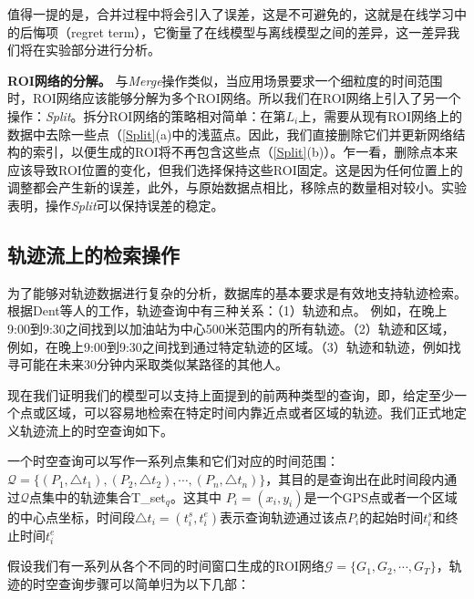值得一提的是，合并过程中将会引入了误差，这是不可避免的，这就是在线学习中的后悔项（regret term），它衡量了在线模型与离线模型之间的差异，这一差异我们将在实验部分进行分析。



\vspace{3mm}
\noindent\textbf{ROI网络的分解。} 
与\emph{Merge}操作类似，当应用场景要求一个细粒度的时间范围时，ROI网络应该能够分解为多个ROI网络。所以我们在ROI网络上引入了另一个操作：\emph{Split}。拆分ROI网络的策略相对简单：在第$L_i$上，需要从现有ROI网络上的数据中去除一些点（\ref{Split}(a)中的浅蓝点。因此，我们直接删除它们并更新网络结构的索引，以便生成的ROI将不再包含这些点（\ref{Split}(b)）。乍一看，删除点本来应该导致ROI位置的变化，但我们选择保持这些ROI固定。这是因为任何位置上的调整都会产生新的误差，此外，与原始数据点相比，移除点的数量相对较小。实验表明，操作\emph{Split}可以保持误差的稳定。

\subsection{轨迹流上的检索操作}
为了能够对轨迹数据进行复杂的分析，数据库的基本要求是有效地支持轨迹检索。根据Dent等人\cite {deng2011trajectory}的工作，轨迹查询中有三种关系：（1）轨迹和点。 例如，在晚上9:00到9:30之间找到以加油站为中心500米范围内的所有轨迹。（2）轨迹和区域，例如，在晚上9:00到9:30之间找到通过特定轨迹的区域。（3）轨迹和轨迹，例如找寻可能在未来30分钟内采取类似某路径的其他人。

现在我们证明我们的模型可以支持上面提到的前两种类型的查询，即，给定至少一个点或区域，可以容易地检索在特定时间内靠近点或者区域的轨迹。我们正式地定义轨迹流上的时空查询如下。


\begin{dingyi}[轨迹的时空查询]
一个时空查询可以写作一系列点集和它们对应的时间范围：$\mathcal{Q} = \{(P_1, \triangle t_1), (P_2, \triangle t_2), \cdots, (P_n, \triangle t_n)\}$，其目的是查询出在此时间段内通过$\mathcal{Q}$点集中的轨迹集合\gls{T_set}$_q$。这其中 $P_i = (x_i, y_i)$是一个GPS点或者一个区域的中心点坐标，时间段$\triangle t_i = (t^s_i, t^e_i)$表示查询轨迹通过该点$P_i$的起始时间$t^s_i$和终止时间$t^e_i$
\end{dingyi}

假设我们有一系列从各个不同的时间窗口生成的ROI网络$\mathcal{G} = \{G_1, G_2, \cdots, G_T\}$，轨迹的时空查询步骤可以简单归为以下几部：


